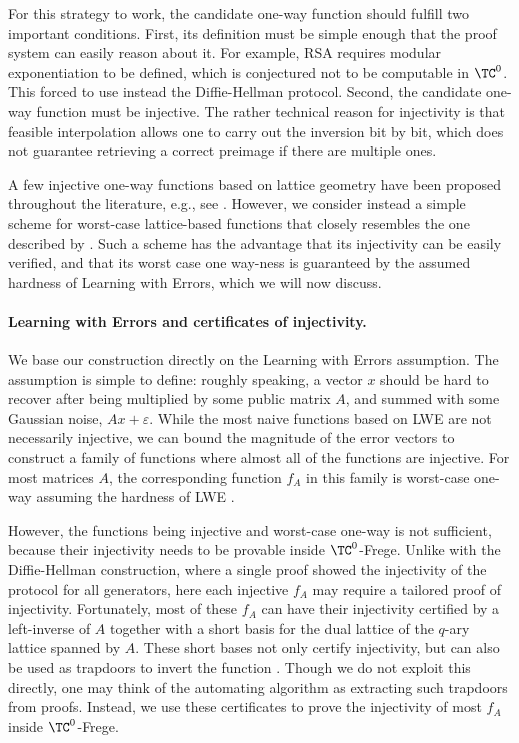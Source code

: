 \documentclass[11pt]{article}
\theoremstyle{definition}
\theoremstyle{plain}
\theoremstyle{remark}
\begin{document}
For this strategy to work, the candidate one-way function should fulfill two important conditions. First, its definition must be simple enough that the proof system can easily reason about it. For example, RSA requires modular exponentiation to be defined, which is conjectured not to be computable in $\TC^0$. This forced \citeauthor{BPR1997} to use instead the Diffie-Hellman protocol. Second, the candidate one-way function must be injective. The rather technical reason for injectivity is that feasible interpolation allows one to carry out the inversion bit by bit, which does not guarantee retrieving a correct preimage if there are multiple ones.

A few injective one-way functions based on lattice geometry have been proposed throughout the literature, e.g., see \cite{peikert2008lossy, goyal2020perfect, micciancio2012trapdoors}. However, we consider instead a simple scheme for worst-case lattice-based functions that closely resembles the one described by \citeauthor{Micciancio2011} \cite{Micciancio2011}. Such a scheme has the advantage that its injectivity can be easily verified, and that its worst case one way-ness is guaranteed by the assumed hardness of Learning with Errors, which we will now discuss.

\paragraph{Learning with Errors and certificates of injectivity.} 
We base our construction directly on the Learning with Errors assumption. The assumption is simple to define: roughly speaking, a vector $x$ should be hard to recover after being multiplied by some public matrix $A$, and summed with some Gaussian noise, $Ax + \varepsilon$. While the most naive functions based on LWE are not necessarily injective, we can bound the magnitude of the error vectors to construct a family of functions where almost all of the functions are injective. For most matrices $A$, the corresponding function $f_A$ in this family is worst-case one-way assuming the hardness of LWE \cite{Micciancio2011}.

However, the functions being injective and worst-case one-way is not sufficient, because their injectivity needs to be provable inside $\TC^0$-Frege. Unlike with the Diffie-Hellman construction, where a single proof showed the injectivity of the protocol for all generators, here each injective $f_A$ may require a tailored proof of injectivity. Fortunately, most of these $f_A$ can have their injectivity certified by a left-inverse of $A$ together with a short basis for the dual lattice of the $q$-ary lattice spanned by $A$. These short bases not only certify injectivity, but can also be used as trapdoors to invert the function \cite{peikert2016decade}. Though we do not exploit this directly, one may think of the automating algorithm as extracting such trapdoors from proofs. Instead, we use these certificates to prove the injectivity of most $f_A$ inside $\TC^0$-Frege.
\end{document}
